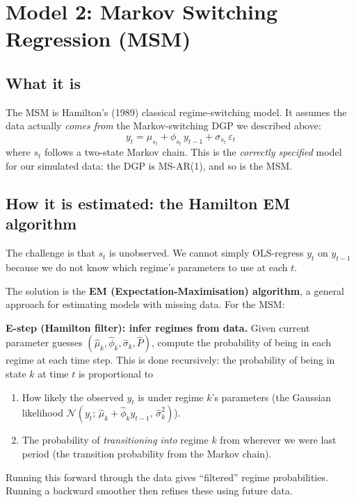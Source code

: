 \documentclass[11pt, a4paper]{article}
\begin{document}
\section{Model 2: Markov Switching Regression (MSM)}

\subsection{What it is}

The MSM is Hamilton's (1989) classical regime-switching model. It assumes the
data actually \emph{comes from} the Markov-switching DGP we described above:
\[
  y_t = \mu_{s_t} + \phi_{s_t}\,y_{t-1} + \sigma_{s_t}\,\varepsilon_t
\]
where $s_t$ follows a two-state Markov chain. This is the \emph{correctly
specified} model for our simulated data: the DGP is MS-AR(1), and so is the
MSM.

\subsection{How it is estimated: the Hamilton EM algorithm}

The challenge is that $s_t$ is unobserved. We cannot simply OLS-regress $y_t$
on $y_{t-1}$ because we do not know which regime's parameters to use at each
$t$.

The solution is the \textbf{EM (Expectation-Maximisation) algorithm}, a
general approach for estimating models with missing data. For the MSM:

\medskip
\textbf{E-step (Hamilton filter): infer regimes from data.}
Given current parameter guesses $(\hat\mu_k, \hat\phi_k, \hat\sigma_k, \hat{P})$,
compute the probability of being in each regime at each time step. This is done
recursively: the probability of being in state $k$ at time $t$ is proportional to

\begin{enumerate}[leftmargin=*, itemsep=2pt]
  \item How likely the observed $y_t$ is under regime $k$'s parameters
        (the Gaussian likelihood $\mathcal{N}(y_t;\,\hat\mu_k + \hat\phi_k y_{t-1},\,\hat\sigma_k^2)$).
  \item The probability of \emph{transitioning into} regime $k$ from wherever
        we were last period (the transition probability from the Markov chain).
\end{enumerate}

Running this forward through the data gives ``filtered'' regime probabilities.
Running a backward smoother then refines these using future data.
\end{document}
